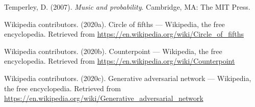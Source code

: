 \documentclass[12pt,oneside]{chicagocapstone}
\begin{document}
\leavevmode\hypertarget{ref-temperley2007}{}%
Temperley, D. (2007). \emph{Music and probability}. Cambridge, MA: The MIT Press.

\leavevmode\hypertarget{ref-wiki_circle_of_fifths}{}%
Wikipedia contributors. (2020a). Circle of fifths --- Wikipedia, the free encyclopedia. Retrieved from \url{https://en.wikipedia.org/wiki/Circle_of_fifths}

\leavevmode\hypertarget{ref-wiki_counterpoint}{}%
Wikipedia contributors. (2020b). Counterpoint --- Wikipedia, the free encyclopedia. Retrieved from \url{https://en.wikipedia.org/wiki/Counterpoint}

\leavevmode\hypertarget{ref-wiki_gan}{}%
Wikipedia contributors. (2020c). Generative adversarial network --- Wikipedia, the free encyclopedia. Retrieved from \url{https://en.wikipedia.org/wiki/Generative_adversarial_network}


\end{document}
